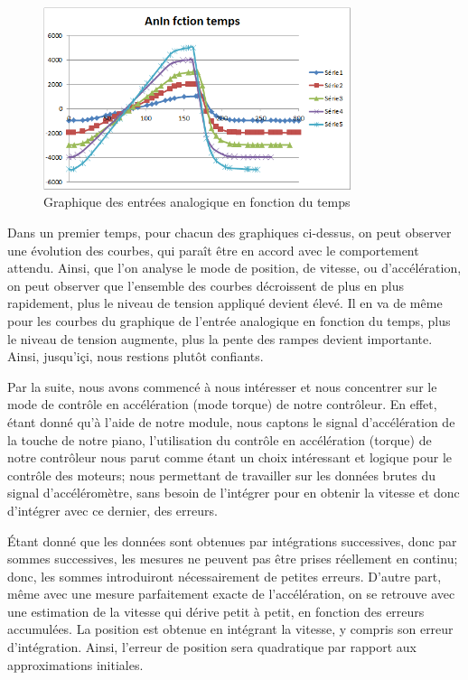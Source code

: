 \documentclass[french,a4paper,12pt]{report}
\begin{document}
{\begin{figure}[h]
\begin{minipage}[c]{.46\linewidth}
         \centering
         \includegraphics[width=9cm]{m1_AnIn.png}
         \caption{Graphique des entrées analogique en fonction du temps}
     \end{minipage}
 	\end{figure}} 
		
	Dans un premier temps, pour chacun des graphiques ci-dessus, on peut observer une évolution des courbes, qui paraît être en accord avec le comportement attendu. Ainsi, que l'on analyse le mode de position, de vitesse, ou d'accélération, on peut observer que l'ensemble des courbes décroissent de plus en plus rapidement, plus le niveau de tension appliqué devient élevé. Il en va de même pour les courbes du graphique de l'entrée analogique en fonction du temps, plus le niveau de tension augmente, plus la pente des rampes devient importante. Ainsi, jusqu'içi, nous restions plutôt confiants.
	
	Par la suite, nous avons commencé à nous intéresser et nous concentrer sur le mode de contrôle en accélération (mode torque) de notre contrôleur. En effet, étant donné qu'à l'aide de notre module, nous captons le signal d'accélération de la touche de notre piano, l'utilisation du contrôle en accélération (torque) de notre contrôleur nous parut comme étant un choix intéressant et logique pour le contrôle des moteurs; nous permettant de travailler sur les données brutes du signal d'accéléromètre, 	sans besoin de l'intégrer pour en obtenir la vitesse et donc d'intégrer avec ce dernier, des erreurs.
	
	Étant donné que les données sont obtenues par intégrations successives, donc par sommes successives, les mesures ne peuvent pas être prises réellement en continu; donc, les sommes introduiront nécessairement de petites erreurs. D'autre part, même avec une mesure parfaitement exacte de l'accélération, on se retrouve avec une estimation de la vitesse qui dérive petit à petit, en fonction des erreurs accumulées. La position est obtenue en intégrant la vitesse, y compris son erreur d'intégration. Ainsi, l'erreur de position sera quadratique par rapport aux approximations initiales. 
	
\end{document}
